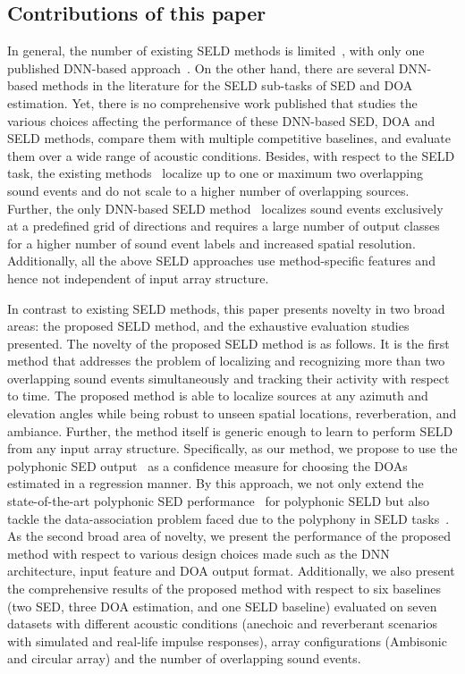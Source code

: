 \documentclass[journal]{IEEEtran}
\begin{document}
\subsection{Contributions of this paper}
In general, the number of existing SELD methods is limited~\cite{Grobler2017,Butko2011,Hirvonen2015,Chakraborty_ICASSP2014, Lopatka2016}, with only one published DNN-based approach~\cite{Hirvonen2015}. On the other hand, there are several DNN-based methods in the literature for the SELD sub-tasks of SED and DOA estimation. Yet, there is no comprehensive work published that studies the various choices affecting the performance of these DNN-based SED, DOA and SELD methods, compare them with multiple competitive baselines, and evaluate them over a wide range of acoustic conditions. Besides, with respect to the SELD task, the existing methods~\cite{Grobler2017,Butko2011, Chakraborty_ICASSP2014, Lopatka2016} localize up to one or maximum two overlapping sound events and do not scale to a higher number of overlapping sources. Further, the only DNN-based SELD method~\cite{Hirvonen2015} localizes sound events exclusively at a predefined grid of directions and requires a large number of output classes for a higher number of sound event labels and increased spatial resolution. Additionally, all the above SELD approaches use method-specific features and hence not independent of input array structure.

In contrast to existing SELD methods, this paper presents novelty in two broad areas: the proposed SELD method, and the exhaustive evaluation studies presented. The novelty of the proposed SELD method is as follows. It is the first method that addresses the problem of localizing and recognizing more than two overlapping sound events simultaneously and tracking their activity with respect to time. The proposed method is able to localize sources at any azimuth and elevation angles while being robust to unseen spatial locations, reverberation, and ambiance. Further, the method itself is generic enough to learn to perform SELD from any input array structure. Specifically, as our method, we propose to use the polyphonic SED output~\cite{Adavanne2017} as a confidence measure for choosing the DOAs estimated in a regression manner. By this approach, we not only extend the state-of-the-art polyphonic SED performance~\cite{Adavanne2017} for polyphonic SELD but also tackle the data-association problem faced due to the polyphony in SELD tasks~\cite{Butko2011}. As the second broad area of novelty, we present the performance of the proposed method with respect to various design choices made such as the DNN architecture, input feature and DOA output format. Additionally, we also present the comprehensive results of the proposed method with respect to six baselines (two SED, three DOA estimation, and one SELD baseline) evaluated on seven datasets with different acoustic conditions (anechoic and reverberant scenarios with simulated and real-life impulse responses), array configurations (Ambisonic and circular array) and the number of overlapping sound events.
\end{document}
